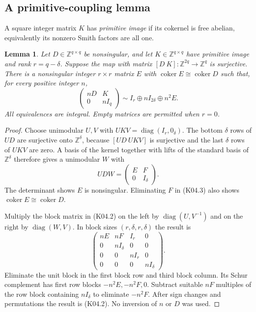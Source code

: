 \documentclass[11pt,a4paper]{article}
\newtheorem{lemma}[theorem]{Lemma}
\theoremstyle{definition}\newtheorem{definition}[theorem]{Definition}
\theoremstyle{remark}\newtheorem{remark}[theorem]{Remark}
\newcommand{\Z}{\mathbb Z}\newcommand{\Q}{\mathbb Q}\newcommand{\F}{\mathbb F}
\DeclareMathOperator{\coker}{coker}\DeclareMathOperator{\diag}{diag}\DeclareMathOperator{\rank}{rank}
\numberwithin{equation}{section}
\begin{document}
\subsection{A primitive-coupling lemma}\label{K04-sec-2}
A square integer matrix $K$ has \emph{primitive image} if its cokernel is free abelian, equivalently its nonzero Smith factors are all one.
\begin{lemma}\label{K04-coupling}
Let $D\in\Z^{q\times q}$ be nonsingular, and let $K\in\Z^{q\times q}$ have primitive image and rank $r=q-\delta$. Suppose the map with matrix $[D\ K]:\Z^{2q}\to\Z^q$ is surjective. There is a nonsingular integer $r\times r$ matrix $E$ with $\coker E\cong\coker D$ such that, for every positive integer $n$,
\[
 \begin{pmatrix}nD&K\\0&nI_q\end{pmatrix}
 \sim I_r\oplus nI_{2\delta}\oplus n^2E.                     \tag{K04.2}
\]
All equivalences are integral. Empty matrices are permitted when $r=0$.
\end{lemma}
\begin{proof}
Choose unimodular $U,V$ with $UKV=\diag(I_r,0_\delta)$. The bottom $\delta$ rows of $UD$ are surjective onto $\Z^\delta$, because $[UD\ UKV]$ is surjective and the last $\delta$ rows of $UKV$ are zero. A basis of the kernel together with lifts of the standard basis of $\Z^\delta$ therefore gives a unimodular $W$ with
\[
 UDW=\begin{pmatrix}E&F\\0&I_\delta\end{pmatrix}.             \tag{K04.3}
\]
The determinant shows $E$ is nonsingular. Eliminating $F$ in (K04.3) also shows $\coker E\cong\coker D$.

Multiply the block matrix in (K04.2) on the left by $\diag(U,V^{-1})$ and on the right by $\diag(W,V)$. In block sizes $(r,\delta,r,\delta)$ the result is
\[
 \begin{pmatrix}
 nE&nF&I_r&0\\
 0&nI_\delta&0&0\\
 0&0&nI_r&0\\
 0&0&0&nI_\delta
 \end{pmatrix}.                                               \tag{K04.4}
\]
Eliminate the unit block in the first block row and third block column. Its Schur complement has first row blocks $-n^2E,-n^2F,0$. Subtract suitable $nF$ multiples of the row block containing $nI_\delta$ to eliminate $-n^2F$. After sign changes and permutations the result is (K04.2). No inversion of $n$ or $D$ was used.
\end{proof}
\end{document}
